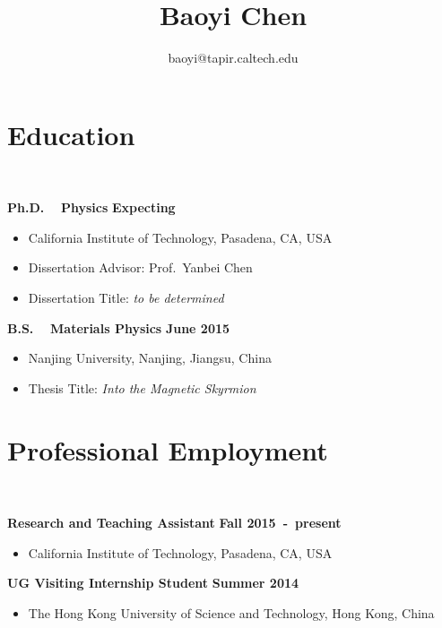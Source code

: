 \documentclass[11pt]{article}
\title{\bfseries\Huge Baoyi Chen}
\author{baoyi@tapir.caltech.edu}
\date{}
\begin{document}
\maketitle


\section*{\sc Education}~
\vspace{-.1in}

{\bf Ph.D.}~~
{\bf Physics}
\hfill{\bf Expecting}
\vspace*{.05in} 
\begin{itemize}
 \item[] California Institute of Technology, Pasadena, CA, USA 
 \item[] Dissertation Advisor: Prof.~Yanbei Chen 
 \item[] Dissertation Title: {\it to be determined}
\end{itemize}
\vspace*{.2in}


{\bf B.S.}~~
{\bf Materials Physics} 
\hfill {\bf June 2015}
\vspace*{.05in} 
\begin{itemize}
 \item[]  Nanjing University, Nanjing, Jiangsu, China 
 \item[] Thesis Title: {\it Into the Magnetic Skyrmion}
\end{itemize}

\vspace{0.8cm}


\section*{\sc Professional Employment}~
\vspace{-.1in}


{\bf Research and Teaching Assistant}
\hfill
{\bf Fall 2015~-~present}
\begin{itemize}
 \item[] California Institute of Technology, Pasadena, CA, USA 
\end{itemize}

\vspace*{.2in}

{\bf UG Visiting Internship Student}
\hfill {\bf Summer 2014}
\begin{itemize}
	\item[]  The Hong Kong University of Science and Technology, Hong Kong, China 
\end{itemize}
\end{document}
